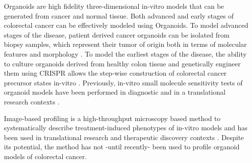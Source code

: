\begin{flushleft}
Organoids are high fidelity three-dimensional in-vitro models that can be generated from cancer and normal tissue. Both advanced and early stages of colorectal cancer can be effectively modeled using Organoids. To model advanced stages of the disease, patient derived cancer organoids can be isolated from biopsy samples, which represent their tumor of origin both in terms of molecular features and morphology \citep{pauliPersonalizedVitroVivo2017a}. To model the earliest stages of the disease, the ability to culture organoids derived from healthy colon tissue and genetically engineer them using CRISPR allows the step-wise construction of colorectal cancer precursor states in-vitro \citep{matanoModelingColorectalCancer2015a, drostUseCRISPRmodifiedHuman2017}. Previously, in-vitro small molecule sensitivity tests of organoid models have been performed in diagnostic and in a translational research contexts \citep{vandeweteringProspectiveDerivationLiving2015, vlachogiannisPatientderivedOrganoidsModel2018, ganeshRectalCancerOrganoid2019, ooftPatientderivedOrganoidsCan2019, yaoPatientDerivedOrganoidsPredict2020}. 
\par
Image-based profiling is a high-throughput microscopy based method to systematically describe treatment-induced phenotypes of in-vitro models and has been used in translational research and therapeutic discovery contexts \citep{caicedoApplicationsImagebasedProfiling2016}. Despite its potential, the method has not -until recently- \citep{betgeDruginducedPhenotypicLandscape2022} been used to profile organoid models of colorectal cancer.
\par


\end{flushleft}
